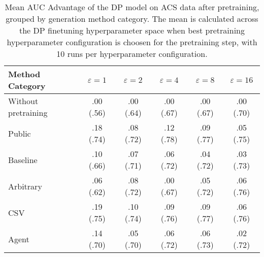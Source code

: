 \begin{table}[h!]
    \centering
    \caption{Mean AUC Advantage of the DP model on ACS data after pretraining, grouped by generation method category. The mean is calculated across the DP finetuning hyperparameter space when best pretraining hyperparameter configuration is choosen for the pretraining step, with 10 runs per hyperparameter configuration.}
    \label{tab:epsilon_comparison}
    \begin{tabular}{lccccc}
    \toprule
    Method Category & $\varepsilon=1$ & $\varepsilon=2$ & $\varepsilon=4$ & $\varepsilon=8$ & $\varepsilon=16$ \\
    \midrule
    Without pretraining & .00 {\small (.56)} & .00 {\small (.64)} & .00 {\small (.67)} & .00 {\small (.67)} & .00 {\small (.70)} \\
    \arrayrulecolor{black!50!}\midrule
    Public & \cellcolor{silver!30}.18 {\small (.74)} & \cellcolor{silver!30}.08 {\small (.72)} & \cellcolor{gold!30}.12 {\small (.78)} & \cellcolor{gold!30}.09 {\small (.77)} & \cellcolor{bronze!30}.05 {\small (.75)} \\
    \arrayrulecolor{black!50!}\midrule
    Baseline & .10 {\small (.66)} & \cellcolor{bronze!30}.07 {\small (.71)} & \cellcolor{bronze!30}.06 {\small (.72)} & .04 {\small (.72)} & .03 {\small (.73)} \\
    \arrayrulecolor{black!50!}\midrule
    Arbitrary & .06 {\small (.62)} & \cellcolor{silver!30}.08 {\small (.72)} & .00 {\small (.67)} & \cellcolor{bronze!30}.05 {\small (.72)} & \cellcolor{silver!30}.06 {\small (.76)} \\
    \arrayrulecolor{black!50!}\midrule
    CSV & \cellcolor{gold!30}.19 {\small (.75)} & \cellcolor{gold!30}.10 {\small (.74)} & \cellcolor{silver!30}.09 {\small (.76)} & \cellcolor{gold!30}.09 {\small (.77)} & \cellcolor{gold!30}.06 {\small (.76)} \\
    Agent & \cellcolor{bronze!30}.14 {\small (.70)} & .05 {\small (.70)} & .06 {\small (.72)} & \cellcolor{silver!30}.06 {\small (.73)} & .02 {\small (.72)} \\
    \bottomrule
    \end{tabular}
\end{table}